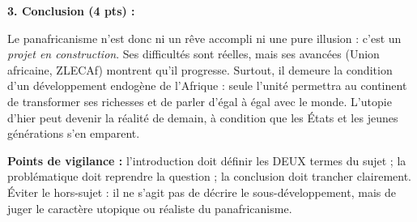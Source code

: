 \documentclass[11pt]{article}
\begin{document}
\begin{corrige}
\textbf{3. Conclusion (4 pts) :}

Le panafricanisme n'est donc ni un rêve accompli ni une pure illusion : c'est un \emph{projet en construction}. Ses difficultés sont réelles, mais ses avancées (Union africaine, ZLECAf) montrent qu'il progresse. Surtout, il demeure la condition d'un développement endogène de l'Afrique : seule l'unité permettra au continent de transformer ses richesses et de parler d'égal à égal avec le monde. L'utopie d'hier peut devenir la réalité de demain, à condition que les États et les jeunes générations s'en emparent.

\textbf{Points de vigilance :} l'introduction doit définir les DEUX termes du sujet ; la problématique doit reprendre la question ; la conclusion doit trancher clairement. Éviter le hors-sujet : il ne s'agit pas de décrire le sous-développement, mais de juger le caractère utopique ou réaliste du panafricanisme.
\end{corrige}
\end{document}
